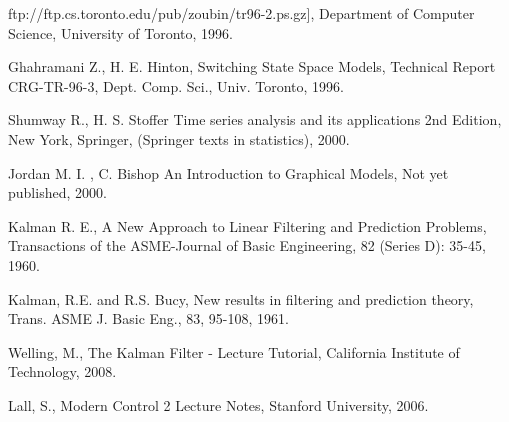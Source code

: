 \documentclass[12pt,fleqn]{article}
\begin{document}
ftp://ftp.cs.toronto.edu/pub/zoubin/tr96-2.ps.gz], Department of Computer
Science, University of Toronto, 1996. 

Ghahramani Z., H. E. Hinton, Switching State Space Models, Technical Report
CRG-TR-96-3, Dept. Comp. Sci., Univ. Toronto, 1996. 

Shumway R., H. S. Stoffer Time series analysis and its applications 2nd
Edition, New York, Springer, (Springer texts in statistics), 2000. 

Jordan M. I. , C. Bishop An Introduction to Graphical Models, Not yet
published, 2000. 

Kalman R. E., A New Approach to Linear Filtering and Prediction Problems,
Transactions of the ASME-Journal of Basic Engineering, 82 (Series D):
35-45, 1960.

Kalman, R.E. and R.S. Bucy, New results in filtering and prediction theory,
Trans. ASME J. Basic Eng., 83, 95-108, 1961. 

Welling, M., The Kalman Filter - Lecture Tutorial, California Institute of
Technology, 2008. 

Lall, S., Modern Control 2 Lecture Notes, Stanford University, 2006.
\end{document}
